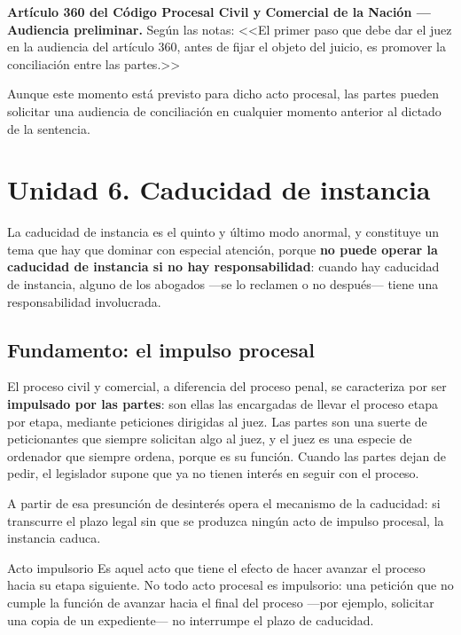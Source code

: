 \documentclass[12pt,oneside]{book}
\begin{document}
\begin{important}
\textbf{Artículo 360 del Código Procesal Civil y Comercial de la Nación --- Audiencia preliminar.}
Según las notas: <<El primer paso que debe dar el juez en la audiencia del artículo 360, antes de fijar el objeto del juicio, es promover la conciliación entre las partes.>>

Aunque este momento está previsto para dicho acto procesal, las partes pueden solicitar una audiencia de conciliación en cualquier momento anterior al dictado de la sentencia.
\end{important}

\section{Unidad 6. Caducidad de instancia}

La caducidad de instancia es el quinto y último modo anormal, y constituye un tema que hay que dominar con especial atención, porque \textbf{no puede operar la caducidad de instancia si no hay responsabilidad}: cuando hay caducidad de instancia, alguno de los abogados ---se lo reclamen o no después--- tiene una responsabilidad involucrada.

\subsection{Fundamento: el impulso procesal}

El proceso civil y comercial, a diferencia del proceso penal, se caracteriza por ser \textbf{impulsado por las partes}: son ellas las encargadas de llevar el proceso etapa por etapa, mediante peticiones dirigidas al juez. Las partes son una suerte de peticionantes que siempre solicitan algo al juez, y el juez es una especie de ordenador que siempre ordena, porque es su función. Cuando las partes dejan de pedir, el legislador supone que ya no tienen interés en seguir con el proceso.

A partir de esa presunción de desinterés opera el mecanismo de la caducidad: si transcurre el plazo legal sin que se produzca ningún acto de impulso procesal, la instancia caduca.

\begin{definition}{Acto impulsorio}
Es aquel acto que tiene el efecto de hacer avanzar el proceso hacia su etapa siguiente. No todo acto procesal es impulsorio: una petición que no cumple la función de avanzar hacia el final del proceso ---por ejemplo, solicitar una copia de un expediente--- no interrumpe el plazo de caducidad.
\end{definition}
\end{document}
